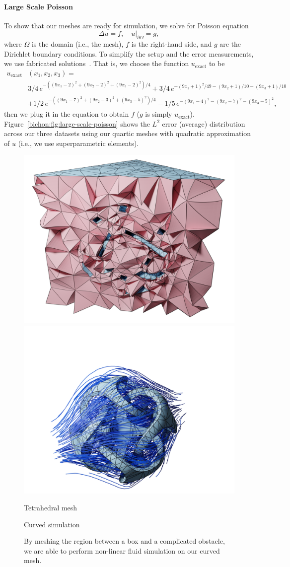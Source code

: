 \paragraph{Large Scale Poisson}
To show that our meshes are ready for simulation, we solve for Poisson equation
\[
\Delta u  = f,\quad
u|_{\partial \Omega} = g,
\]
where $\Omega$ is the domain (i.e., the mesh), $f$ is the right-hand side, and $g$ are the Dirichlet boundary conditions. To simplify the setup and the error measurements, we use fabricated solutions~\cite{SALARI:2000:CVB}. That is, we choose the function $u_\text{exact}$ to be {%
\begin{align*}
u_\text{exact}&(x_1,x_2,x_3) =
\\&3/4\,{ e}^{-((9x_1-2)^2+(9x_2-2)^2+(9x_3-2)^2)/4}+
3/4\,{ e}^{-(9x_1+1)^2/49-(9x_2+1)/10-(9x_3+1)/10} \\
%
&+1/2\,{ e}^{-((9x_1-7)^2+(9x_2-3)^2+(9x_3-5)^2)/4}-
1/5\,{ e}^{-(9x_1-4)^2-(9x_2-7)^2-(9x_3-5)^2},
\end{align*}}
then we plug it in the equation to obtain $f$ ($g$ is simply $u_\text{exact}$). Figure~\ref{bichon:fig:large-scale-poisson} shows the $L^2$ error (average) distribution across our three datasets using our quartic meshes with quadratic approximation of $u$ (i.e., we use superparametric elements).


\begin{figure}
    \centering\small
    \includegraphics[width=.45\linewidth]{curve_meshing_in_shell_tex/figs/fluid/0003}\hfill
    \includegraphics[width=.53\linewidth]{curve_meshing_in_shell_tex/figs/fluid/0002}\hfill
    \parbox{.45\linewidth}{\centering Tetrahedral mesh}\hfill
    \parbox{.53\linewidth}{\centering Curved simulation}\hfill
    \caption{By meshing the region between a box and a complicated obstacle, we are able to perform non-linear fluid simulation on our curved mesh.}
    \label{bichon:fig:ns}
\end{figure}
